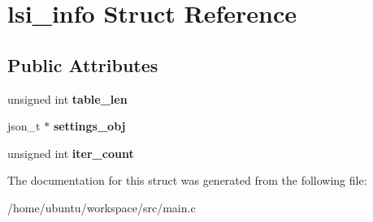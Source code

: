 \hypertarget{structlsi__info}{\section{lsi\-\_\-info Struct Reference}
\label{structlsi__info}
}
\subsection*{Public Attributes}
\begin{DoxyCompactItemize}
\item 
\hypertarget{structlsi__info_a5c66ebbfb1526c92c68fb5ac403acf0b}{unsigned int {\bfseries table\-\_\-len}}\label{structlsi__info_a5c66ebbfb1526c92c68fb5ac403acf0b}

\item 
\hypertarget{structlsi__info_a450da3539ae79eb9373857897d0c63a1}{json\-\_\-t $\ast$ {\bfseries settings\-\_\-obj}}\label{structlsi__info_a450da3539ae79eb9373857897d0c63a1}

\item 
\hypertarget{structlsi__info_a154a97e557122436a68d31bd447810fa}{unsigned int {\bfseries iter\-\_\-count}}\label{structlsi__info_a154a97e557122436a68d31bd447810fa}

\end{DoxyCompactItemize}


The documentation for this struct was generated from the following file\-:\begin{DoxyCompactItemize}
\item 
/home/ubuntu/workspace/src/main.\-c\end{DoxyCompactItemize}
